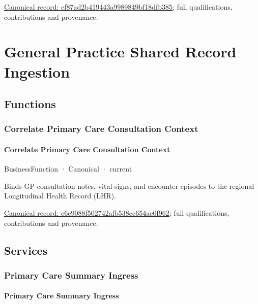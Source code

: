 {\footnotesize \href{../../../../continuum/business/business-service/ef87ad2b419443a9989849bf18dfb385.md}{Canonical record: ef87ad2b419443a9989849bf18dfb385}; full qualifications, contributions and provenance.}\par
\section{General Practice Shared Record Ingestion}

\subsection{Functions}

\subsubsection{Correlate Primary Care Consultation Context}

\paragraph{Correlate Primary Care Consultation Context}

\label{element:e6c9088f502742afb538ee654ac0f962}
{\small BusinessFunction · Canonical · current}\par

Binds GP consultation notes, vital signs, and encounter episodes to the regional Longitudinal Health Record (LHR).


{\footnotesize \href{../../../../continuum/business/business-function/e6c9088f502742afb538ee654ac0f962.md}{Canonical record: e6c9088f502742afb538ee654ac0f962}; full qualifications, contributions and provenance.}\par
\subsection{Services}

\subsubsection{Primary Care Summary Ingress}

\paragraph{Primary Care Summary Ingress}


